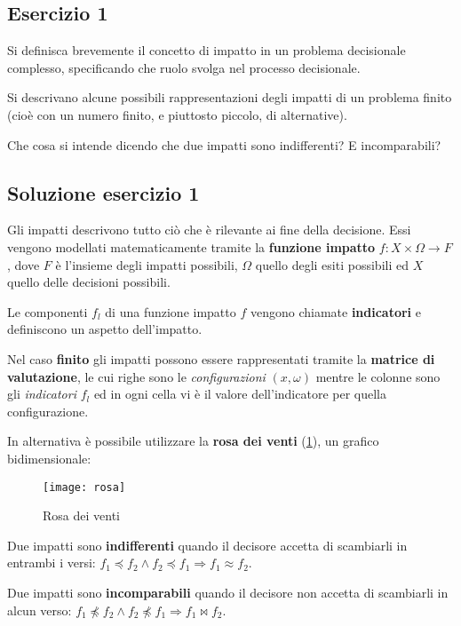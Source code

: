 \documentclass[\main/main.tex]{subfiles}
\begin{document}
\subsection{Esercizio 1}

Si definisca brevemente il concetto di impatto in un problema decisionale complesso, specificando che ruolo svolga nel processo decisionale.

Si descrivano alcune possibili rappresentazioni degli impatti di un problema finito (cioè con un numero finito, e piuttosto piccolo, di alternative).

Che cosa si intende dicendo che due impatti sono indifferenti? E incomparabili?

\subsection{Soluzione esercizio 1}
Gli impatti descrivono tutto ciò che è rilevante ai fine della decisione. Essi vengono modellati matematicamente tramite la \textbf{funzione impatto} $f: X \times \Omega \rightarrow F$, dove $F$ è l'insieme degli impatti possibili, $\Omega$ quello degli esiti possibili ed $X$ quello delle decisioni possibili.

Le componenti $f_l$ di una funzione impatto $f$ vengono chiamate \textbf{indicatori} e definiscono un aspetto dell'impatto.

Nel caso \textbf{finito} gli impatti possono essere rappresentati tramite la \textbf{matrice di valutazione}, le cui righe sono le \textit{configurazioni} $(x,\omega)$ mentre le colonne sono gli \textit{indicatori} $f_l$ ed in ogni cella vi è il valore dell'indicatore per quella configurazione.

In alternativa è possibile utilizzare la \textbf{rosa dei venti} (\ref{rosa_dei_venti}), un grafico bidimensionale:

\begin{figure}
  \texttt{[image: rosa]}
  \caption{Rosa dei venti}
  \label{rosa_dei_venti}
\end{figure}

Due impatti sono \textbf{indifferenti} quando il decisore accetta di scambiarli in entrambi i versi: $f_1 \preceq f_2  \land f_2 \preceq f_1 \Rightarrow f_1 \approx f_2$.

Due impatti sono \textbf{incomparabili} quando il decisore non accetta di scambiarli in alcun verso: $f_1 \npreceq f_2  \land f_2 \npreceq f_1 \Rightarrow f_1 \bowtie f_2$.
\end{document}
